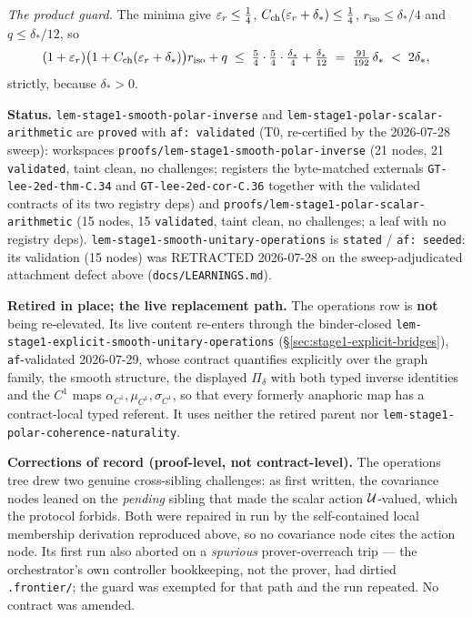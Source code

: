 \emph{The product guard.} The minima give $\varepsilon_r\le\tfrac14$,
$C_{\mathrm{ch}}(\varepsilon_r+\delta_*)\le\tfrac14$, $r_{\mathrm{iso}}\le\delta_*/4$ and
$q\le\delta_*/12$, so
\begin{equation}\label{eq:s1sa-product}
  (1+\varepsilon_r)\bigl(1+C_{\mathrm{ch}}(\varepsilon_r+\delta_*)\bigr)r_{\mathrm{iso}}+q
  \;\le\;\tfrac54\cdot\tfrac54\cdot\tfrac{\delta_*}4+\tfrac{\delta_*}{12}
  \;=\;\tfrac{91}{192}\,\delta_*\;<\;2\delta_* ,
\end{equation}
strictly, because $\delta_*>0$.

\medskip
\noindent\textbf{Status.} \texttt{lem-stage1-smooth-polar-inverse} and
\texttt{lem-stage1-polar-scalar-arithmetic} are \texttt{proved} with \texttt{af: validated}
(T0, re-certified by the 2026-07-28 sweep): workspaces
\texttt{proofs/lem-stage1-smooth-polar-inverse} (21 nodes, 21 \texttt{validated}, taint
clean, no challenges; registers the byte-matched externals \texttt{GT-lee-2ed-thm-C.34}
and \texttt{GT-lee-2ed-cor-C.36} together with the validated contracts of its two registry
deps) and \texttt{proofs/lem-stage1-polar-scalar-arithmetic} (15 nodes, 15
\texttt{validated}, taint clean, no challenges; a leaf with no registry deps).
\texttt{lem-stage1-smooth-unitary-operations} is \texttt{stated} / \texttt{af: seeded}: its
validation (15 nodes) was RETRACTED 2026-07-28 on the sweep-adjudicated attachment defect
above (\texttt{docs/LEARNINGS.md}).

\noindent\textbf{Retired in place; the live replacement path.} The operations row is
\textbf{not} being re-elevated. Its live content re-enters through the binder-closed
\texttt{lem-stage1-explicit-smooth-unitary-operations}
(\S\ref{sec:stage1-explicit-bridges}), \texttt{af}-validated 2026-07-29, whose contract
quantifies explicitly over the graph family, the smooth structure, the displayed
$\Pi_\delta$ with both typed inverse identities and the $C^{1}$ maps
$\alpha_{C^{1}},\mu_{C^{1}},\sigma_{C^{1}}$, so that every formerly anaphoric map has a
contract-local typed referent. It uses neither the retired parent nor
\texttt{lem-stage1-polar-coherence-naturality}.

\noindent\textbf{Corrections of record (proof-level, not contract-level).} The operations
tree drew two genuine cross-sibling challenges: as first written, the covariance nodes
leaned on the \emph{pending} sibling that made the scalar action $\mathcal U$-valued, which the
protocol forbids. Both were repaired in run by the self-contained local membership
derivation reproduced above, so no covariance node cites the action node. Its first run
also aborted on a \emph{spurious} prover-overreach trip --- the orchestrator's own
controller bookkeeping, not the prover, had dirtied \texttt{.frontier/}; the guard was
exempted for that path and the run repeated. No contract was amended.

